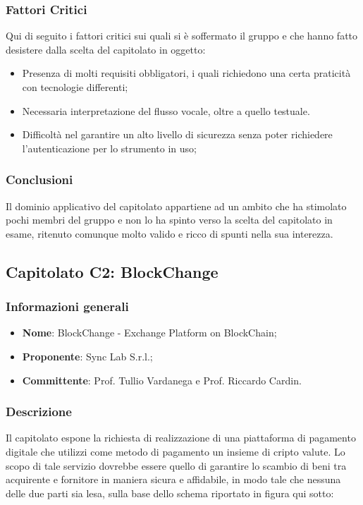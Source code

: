 \documentclass[11pt]{article}
\begin{document}
    \subsubsection{Fattori Critici}
    Qui di seguito i fattori critici sui quali si è soffermato il gruppo e che hanno fatto desistere dalla scelta del capitolato in
    oggetto:
    	\begin{itemize}
            \item Presenza di molti requisiti obbligatori, i quali richiedono una certa praticità con tecnologie differenti;
            \item Necessaria interpretazione del flusso vocale, oltre a quello testuale.
            \item Difficoltà nel garantire un alto livello di sicurezza senza poter richiedere l'autenticazione per lo strumento in uso;
        \end{itemize}
        
    \subsubsection{Conclusioni}
    Il dominio applicativo del capitolato appartiene ad un ambito che ha stimolato pochi membri del gruppo e non lo ha spinto verso
    la scelta del capitolato in esame, ritenuto comunque molto valido e ricco di spunti nella sua interezza.
    
    \newpage


\subsection{Capitolato C2: BlockChange}

    \subsubsection{Informazioni generali}
    \begin{itemize}
        \item \textbf{Nome}: BlockChange - Exchange Platform on BlockChain;
        \item \textbf{Proponente}: Sync Lab S.r.l.;
        \item \textbf{Committente}: Prof. Tullio Vardanega e Prof. Riccardo Cardin.
    \end{itemize}
    
    \subsubsection{Descrizione}
	Il capitolato espone la richiesta di realizzazione di una piattaforma di pagamento digitale che utilizzi come metodo di pagamento
	un insieme di cripto valute. Lo scopo di tale servizio dovrebbe essere quello di garantire lo scambio di beni tra acquirente e
	fornitore in maniera sicura e affidabile, in modo tale che nessuna delle due parti sia lesa, sulla base dello schema riportato in
	figura qui sotto:
    
\end{document}
